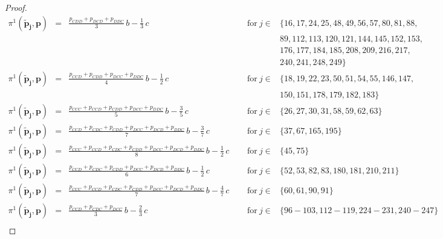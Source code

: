 \documentclass[11pt]{article}
\theoremstyle{plainCl1}
\theoremstyle{plainCl2}
\begin{document}
\begin{proof}
\begin{equation*}
\begin{array}{lclll}
  \pi^1(\mathbf{\tilde p_j},\mathbf{p}) &= 
  &\displaystyle \frac{p_{CDD} + p_{DCD} + p_{DDC}}{3} \, b - \frac{1}{3} \, c
  &~\text{for}~ j\! \in\! 
  & \{16,17,24,25,48,49,56,57,80,81,88,
      \\ & & & &89,112, 113,120,121, 144,145,152,153,
      \\ & & & &176,177,184,185,208,209,216,217,
      \\ & & & &240, 241,248,249\} \\[0.2cm]
      
  \pi^1(\mathbf{\tilde p_j},\mathbf{p}) &= 
  &\displaystyle \frac{p_{CCD} + p_{CDD} + p_{DCC} + p_{DDC}}{4} \, b - \frac{1}{2} \, c
  &~\text{for}~ j\! \in\! 
  & \{ 18, 19, 22, 23, 50, 51, 54, 55, 146, 147,
      \\ & & &  &150, 151, 178, 179, 182, 183\} \\[0.2cm]
      
  \pi^1(\mathbf{\tilde p_j},\mathbf{p}) &= 
  &\displaystyle \frac{p_{CCC} + p_{CCD} + p_{CDD} + p_{DCC} + p_{DDC}}{5} \, b - \frac{3}{5} \, c
  &~\text{for}~ j\! \in\! 
  & \{ 26, 27, 30, 31, 58, 59, 62, 63\} \\ [0.2cm]
  
  \pi^1(\mathbf{\tilde p_j},\mathbf{p}) &= 
  &\displaystyle \frac{p_{CCD} + p_{CDC} + p_{CDD} + p_{DCC} + p_{DCD} + p_{DDC}}{7}\, b - \frac{3}{7} \, c
  &~\text{for}~ j\! \in\! 
  & \{ 37, 67, 165, 195\} \\ [0.2cm]
  
  \pi^1(\mathbf{\tilde p_j},\mathbf{p}) &= 
  &\displaystyle \frac{p_{CCC} + p_{CCD} + p_{CDC} + p_{CDD} + p_{DCC} + p_{DCD} + p_{DDC}}{8} \, b - \frac{1}{2} \, c ~~~~~
  &~\text{for}~ j\! \in\! 
  & \{ 45, 75\} \\ [0.2cm]
  
  \pi^1(\mathbf{\tilde p_j},\mathbf{p}) &= 
  &\displaystyle \frac{p_{CCD}+ p_{CDC}+ p_{CDD}+ p_{DCC}+ p_{DCD}+ p_{DDC}}{6} \, b - \frac{1}{2} \, c
  &~\text{for}~ j\! \in\! 
  & \{ 52, 53, 82, 83, 180, 181, 210, 211\} \\  [0.2cm]
  
  \pi^1(\mathbf{\tilde p_j},\mathbf{p}) &= 
  &\displaystyle \frac{p_{CCC} + p_{CCD} + p_{CDC} + p_{CDD} + p_{DCC} + p_{DCD} + p_{DDC}}{7} \, b - \frac{4}{7} \, c
  &~\text{for}~ j\! \in\! 
  & \{ 60, 61, 90, 91\} \\ [0.2cm]
  
  \pi^1(\mathbf{\tilde p_j},\mathbf{p}) &= 
  &\displaystyle \frac{p_{CCD} + p_{CDC} + p_{DCC}}{3} \, b - \frac{2}{3} \, c
  &~\text{for}~ j\! \in\! 
  & \{ 96\!- \!103, 112\!- \!119, 224\!- \!231, 240\!- \!247\} \\ [0.2cm]
      

\end{array}
\end{equation*}
\end{proof}
\end{document}
